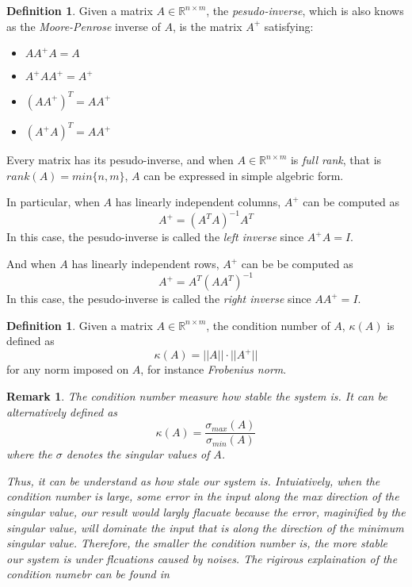 \documentclass[12pt]{amsart}
\numberwithin{equation}{section}
\newtheorem{remark}[thm]{Remark}
\theoremstyle{definition}
\newtheorem{definition}[thm]{Definition}
\numberwithin{thm}{section}
\begin{document}
\begin{definition}
     Given a matrix $A \in \mathbb{R}^{n \times m}$, the \emph{pesudo-inverse},
     which is also knows as the \emph{Moore-Penrose} inverse of $A$, is the matrix
     $A^+$ satisfying:
     \begin{itemize}
          \item $A A^+ A = A$
          \item $A^+ A A^+ = A^+$
          \item $(A A^+)^T = A A^+$
          \item $(A^+ A)^T = A A^+$
        \end{itemize}
     
\end{definition}
\smallskip
     Every matrix has its pesudo-inverse, and when $A \in \mathbb{R}^{n \times m}$ is \emph{full rank}, 
     that is $rank(A) = min\{n, m\}$, $A$ can be expressed in simple algebric form.
     
     In particular, when $A$ has linearly independent columns, $A^+$ can be computed as
     \begin{equation}
          A^+ = (A^T A)^{-1} A^T
     \end{equation}
     In this case, the pesudo-inverse is called the \emph{left inverse} since $A^+ A = I$.

     \smallskip
     And when $A$ has linearly independent rows, $A^+$ can be be computed as
     \begin{equation}
          A^+ = A^T (A A^T)^{-1}
     \end{equation}
     In this case, the pesudo-inverse is called the \emph{right inverse} since $A A^+ = I$. 


\begin{definition}
     Given a matrix $A \in \mathbb{R}^{n \times m}$, the condition number of $A$, $\kappa(A)$ is defined as
     \begin{equation}
          \kappa(A) = ||A|| \cdot ||A^+||
     \end{equation}
     for any norm imposed on $A$, for instance \emph{Frobenius norm}.
\end{definition}

\begin{remark}
     The condition number measure how stable the system is. It can be alternatively defined as
     \begin{equation}
          \kappa(A) = \frac{\sigma_{max} (A)}{\sigma_{min} (A)}
     \end{equation}
     where the $\sigma$ denotes the singular values of $A$.

     Thus, it can be understand as how stale our system is. 
     Intuiatively, when the condition number is large, some error in the input along the max direction of the singular value,
     our result would largly flacuate because the error, maginified by the singular value, will dominate the input that is along
     the direction of the minimum singular value. 
     Therefore, the smaller the condition number is, the more stable our system is under flcuations caused by noises.
     The rigirous explaination of the condition numebr can be found in \cite{Cheney:Kincaid}
\end{remark}
\end{document}

